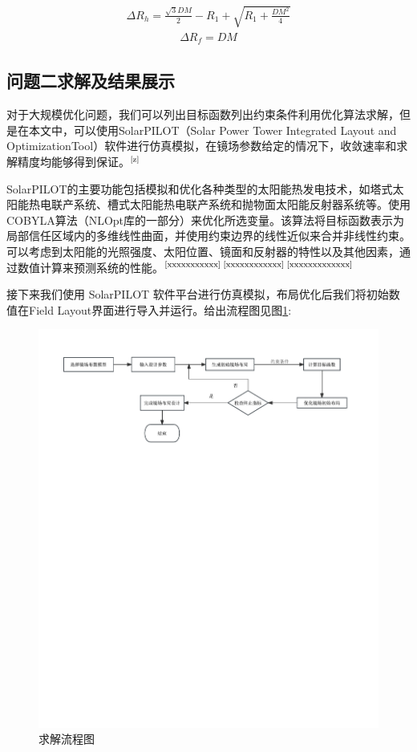 \documentclass[withoutpreface,bwprint]{cumcmthesis} %
\begin{document}
\begin{eqnarray}
\Delta R_h=\frac{\sqrt{3}DM}{2}-R_1+\sqrt{R_1+\frac{DM^2}{4}}
\end{eqnarray}
\begin{eqnarray}
\Delta R_f=DM
\end{eqnarray}
\subsection{问题二求解及结果展示}
对于大规模优化问题，我们可以列出目标函数列出约束条件利用优化算法求解，但是在本文中，可以使用SolarPILOT（Solar Power Tower Integrated Layout and OptimizationTool）软件进行仿真模拟，在镜场参数给定的情况下，收敛速率和求解精度均能够得到保证。$^\text{\cite{z}}$

SolarPILOT的主要功能包括模拟和优化各种类型的太阳能热发电技术，如塔式太阳能热电联产系统、槽式太阳能热电联产系统和抛物面太阳能反射器系统等。使用COBYLA算法（NLOpt库的一部分）来优化所选变量。该算法将目标函数表示为局部信任区域内的多维线性曲面，并使用约束边界的线性近似来合并非线性约束。可以考虑到太阳能的光照强度、太阳位置、镜面和反射器的特性以及其他因素，通过数值计算来预测系统的性能。$^\text{\cite{xxxxxxxxxxx}}$$^\text{\cite{xxxxxxxxxxxx}}$$^\text{\cite{xxxxxxxxxxxxx}}$

接下来我们使用 SolarPILOT 软件平台进行仿真模拟，布局优化后我们将初始数值在Field Layout界面进行导入并运行。给出流程图见图\ref{lct}:
\begin{figure}[H]
\centering
\includegraphics[width=\textwidth]{figures/未命名文件.pdf}
\caption{求解流程图}\label{lct}
\end{figure}
\end{document}
